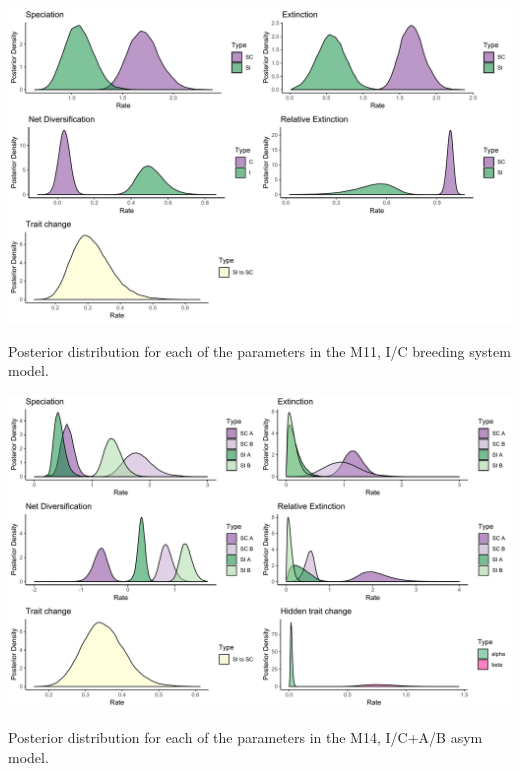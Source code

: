 \begin{suppfigure}
\includegraphics[width=\textwidth]{bisseSIposteriordist.pdf}
\caption{Posterior distribution for each of the parameters in the M11, I/C breeding system model.} %
\label{suppfigure:IC}
\end{suppfigure}


\begin{suppfigure}
\includegraphics[width=\textwidth]{hisseSIasymposteriordist.pdf}
\caption{Posterior distribution for each of the parameters in the M14, I/C+A/B asym model.} %
\label{suppfigure:ICAB}
\end{suppfigure}


